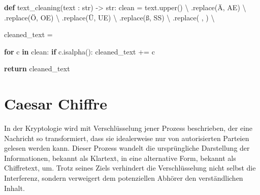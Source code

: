 \documentclass[
  nswissgerman,
  a4paper,
  DIV=11,
  numbers=noendperiod,
  ngerman]{scrreprt}
\newenvironment{Shaded}{\begin{snugshade}}{\end{snugshade}}
\newcommand{\BuiltInTok}[1]{\textcolor[rgb]{0.00,0.23,0.31}{#1}}
\newcommand{\ControlFlowTok}[1]{\textcolor[rgb]{0.00,0.23,0.31}{\textbf{#1}}}
\newcommand{\KeywordTok}[1]{\textcolor[rgb]{0.00,0.23,0.31}{\textbf{#1}}}
\newcommand{\NormalTok}[1]{\textcolor[rgb]{0.00,0.23,0.31}{#1}}
\newcommand{\OperatorTok}[1]{\textcolor[rgb]{0.37,0.37,0.37}{#1}}
\newcommand{\StringTok}[1]{\textcolor[rgb]{0.13,0.47,0.30}{#1}}
\begin{document}
\begin{Shaded}
\begin{Highlighting}[numbers=left,,]
\KeywordTok{def}\NormalTok{ text\_cleaning(text : }\BuiltInTok{str}\NormalTok{) }\OperatorTok{{-}\textgreater{}} \BuiltInTok{str}\NormalTok{:}
\NormalTok{    clean }\OperatorTok{=}\NormalTok{ text.upper() }\OperatorTok{\textbackslash{}}
\NormalTok{                .replace(}\StringTok{\textquotesingle{}Ä\textquotesingle{}}\NormalTok{, }\StringTok{\textquotesingle{}AE\textquotesingle{}}\NormalTok{) }\OperatorTok{\textbackslash{}}
\NormalTok{                .replace(}\StringTok{\textquotesingle{}Ö\textquotesingle{}}\NormalTok{, }\StringTok{\textquotesingle{}OE\textquotesingle{}}\NormalTok{) }\OperatorTok{\textbackslash{}}
\NormalTok{                .replace(}\StringTok{\textquotesingle{}Ü\textquotesingle{}}\NormalTok{, }\StringTok{\textquotesingle{}UE\textquotesingle{}}\NormalTok{) }\OperatorTok{\textbackslash{}}
\NormalTok{                .replace(}\StringTok{\textquotesingle{}ß\textquotesingle{}}\NormalTok{, }\StringTok{\textquotesingle{}SS\textquotesingle{}}\NormalTok{) }\OperatorTok{\textbackslash{}}
\NormalTok{                .replace(}\StringTok{\textquotesingle{} \textquotesingle{}}\NormalTok{, }\StringTok{\textquotesingle{}\textquotesingle{}}\NormalTok{) }\OperatorTok{\textbackslash{}}

\NormalTok{    cleaned\_text }\OperatorTok{=} \StringTok{\textquotesingle{}\textquotesingle{}}

    \ControlFlowTok{for}\NormalTok{ c }\KeywordTok{in}\NormalTok{ clean:}
        \ControlFlowTok{if}\NormalTok{ c.isalpha():}
\NormalTok{            cleaned\_text }\OperatorTok{+=}\NormalTok{ c}
    
    \ControlFlowTok{return}\NormalTok{ cleaned\_text}
\end{Highlighting}
\end{Shaded}

\chapter{Caesar Chiffre}\label{caesar-chiffre}

In der Kryptologie wird mit Verschlüsselung jener Prozess beschrieben,
der eine Nachricht so transformiert, dass sie idealerweise nur von
autorisierten Parteien gelesen werden kann. Dieser Prozess wandelt die
ursprüngliche Darstellung der Informationen, bekannt als Klartext, in
eine alternative Form, bekannt als Chiffretext, um. Trotz seines Ziels
verhindert die Verschlüsselung nicht selbst die Interferenz, sondern
verweigert dem potenziellen Abhörer den verständlichen Inhalt.
\end{document}

